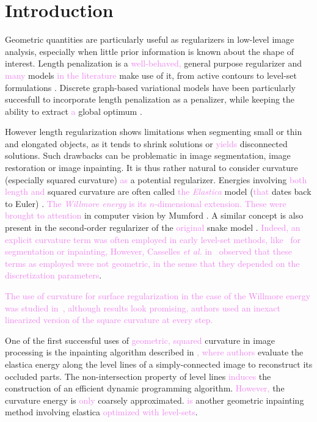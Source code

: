 \documentclass[runningheads]{llncs}
\newcommand{\todo}[1]{{\textcolor{blue}{#1}}}
\newcommand{\HT}[1]{{\textcolor{violet}{#1}}}
\begin{document}
\section{Introduction} %


Geometric quantities are particularly useful as regularizers in low-level image analysis, especially when little prior
information is known about the shape of interest. Length penalization is a \HT{well-behaved,} general purpose
regularizer and \HT{many} models \HT{in the literature} make use of it, from active contours \cite{casseles97geodesic}
to level-set formulations \cite{malladi1995image,malladi1995shape}. Discrete graph-based variational models have been
particularly succesfull to incorporate length penalization as a penalizer, while keeping the ability to extract \HT{a}
global optimum \cite{boykov01graphcut,appleton05geodesic}.

However length regularization shows limitations when segmenting small or thin and elongated objects, as it tends to
shrink solutions or \HT{yields} disconnected solutions. Such drawbacks can be problematic in image segmentation, image
restoration or image inpainting. It is thus rather natural to consider curvature (especially squared curvature) \HT{as}
a potential regularizer. Energies involving \HT{both length and} squared curvature are often called \HT{the {\em Elastica}}
model (\HT{that} dates back to Euler) . \HT{The {\em Willmore energy} is its $n$-dimensional extension. These were brought to
attention} in computer vision by Mumford \cite{mumford1994elastica}. A similar concept is also present in the
second-order regularizer of the \HT{original} snake model \cite{kass1988snakes}. \HT{Indeed, an explicit curvature
  term was often employed in early level-set methods, like~\cite{malladi1995image,malladi1995shape,ballester01filljoint}
  for segmentation or inpainting,} \HT{However, Casselles {\em et al.} in~\cite{casseles97geodesic} observed that these
  terms as employed were not geometric, in the sense that they depended on the discretization parameters}.

\HT{The use of curvature for surface regularization in the case of the Willmore energy was studied
  in~\cite{bobenko2005discrete}, although results look promising, authors used an inexact linearized version of the
  square curvature at every step.}

One of the first successful uses of \HT{geometric, squared} curvature in image processing is the inpainting algorithm
described in \cite{masnou98inpainting}\HT{, where authors} evaluate the elastica energy along the level lines of a
simply-connected image to reconstruct its occluded parts. The non-intersection property of level lines \HT{induces} the
construction of an efficient dynamic programming algorithm. \HT{However, } the curvature energy is \HT{only} coarsely
approximated.  \cite{chan02elasticainpainting} \HT{is} another geometric inpainting method involving elastica
\HT{optimized with level-sets}.
\end{document}
